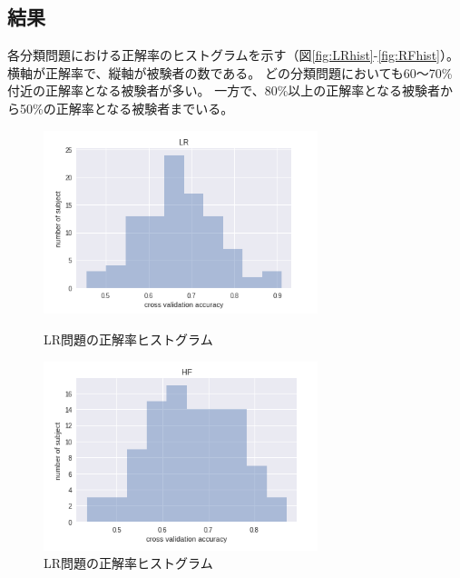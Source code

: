 \subsection{\mc 結果}
各分類問題における正解率のヒストグラムを示す（図\ref{fig:LRhist}-\ref{fig:RFhist}）。
横軸が正解率で、縦軸が被験者の数である。
どの分類問題においても60〜70\%付近の正解率となる被験者が多い。
一方で、80\%以上の正解率となる被験者から50\%の正解率となる被験者までいる。

\begin{figure}[t]
    \begin{minipage}{0.5\hsize}
     \begin{center}
      \includegraphics[width=80mm]{images/LR.png}
     \end{center}
     \caption{LR問題の正解率ヒストグラム}
     \label{fig:LRhist}
    \end{minipage}
    \begin{minipage}{0.5\hsize}
     \begin{center}
      \includegraphics[width=80mm]{images/HF.png}
     \end{center}
     \caption{LR問題の正解率ヒストグラム}
     \label{fig:HFhist}
    \end{minipage}
\end{figure}
